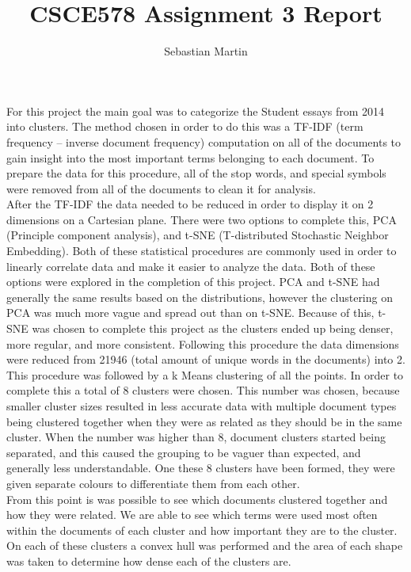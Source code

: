 \documentclass{article}
\title{
CSCE578 Assignment 3 Report
}
\author{Sebastian Martin}
\begin{document}
\maketitle


\begin{addmargin}[4em]{4em}

For this project the main goal was to categorize the Student essays from 2014 into clusters. The method chosen in order to do this was a TF-IDF (term frequency – inverse document frequency) computation on all of the documents to gain insight into the most important terms belonging to each document. To prepare the data for this procedure, all of the stop words, and special symbols were removed from all of the documents to clean it for analysis. \\
After the TF-IDF the data needed to be reduced in order to display it on 2 dimensions on a Cartesian plane. There were two options to complete this, PCA (Principle component analysis), and t-SNE (T-distributed Stochastic Neighbor Embedding). Both of these statistical procedures are commonly used in order to linearly correlate data and make it easier to analyze the data. Both of these options were explored in the completion of this project. PCA and t-SNE had generally the same results based on the distributions, however the clustering on PCA was much more vague and spread out than on t-SNE. Because of this, t-SNE was chosen to complete this project as the clusters ended up being denser, more regular, and more consistent. Following this procedure the data dimensions were reduced from 21946 (total amount of unique words in the documents) into 2. \\
This procedure was followed by a k Means clustering of all the points. In order to complete this a total of 8 clusters were chosen. This number was chosen, because smaller cluster sizes resulted in less accurate data with multiple document types being clustered together when they were as related as they should be in the same cluster. When the number was higher than 8, document clusters started being separated, and this caused the grouping to be vaguer than expected, and generally less understandable. One these 8 clusters have been formed, they were given separate colours to differentiate them from each other. \\
From this point is was possible to see which documents clustered together and how they were related. We are able to see which terms were used most often within the documents of each cluster and how important they are to the cluster. On each of these clusters a convex hull was performed and the area of each shape was taken to determine how dense each of the clusters are. \\
\end{addmargin}
\end{document}
